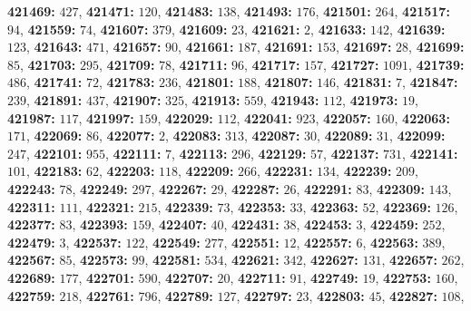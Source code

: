 \textsf{\bfseries 421469:} $427$, \textsf{\bfseries 421471:} $120$, \textsf{\bfseries 421483:} $138$, \textsf{\bfseries 421493:} $176$, \textsf{\bfseries 421501:} $264$, \textsf{\bfseries 421517:} $94$, \textsf{\bfseries 421559:} $74$, \textsf{\bfseries 421607:} $379$, \textsf{\bfseries 421609:} $23$, \textsf{\bfseries 421621:} $2$, \textsf{\bfseries 421633:} $142$, \textsf{\bfseries 421639:} $123$, \textsf{\bfseries 421643:} $471$, \textsf{\bfseries 421657:} $90$, \textsf{\bfseries 421661:} $187$, \textsf{\bfseries 421691:} $153$, \textsf{\bfseries 421697:} $28$, \textsf{\bfseries 421699:} $85$, \textsf{\bfseries 421703:} $295$, \textsf{\bfseries 421709:} $78$, \textsf{\bfseries 421711:} $96$, \textsf{\bfseries 421717:} $157$, \textsf{\bfseries 421727:} $1091$, \textsf{\bfseries 421739:} $486$, \textsf{\bfseries 421741:} $72$, \textsf{\bfseries 421783:} $236$, \textsf{\bfseries 421801:} $188$, \textsf{\bfseries 421807:} $146$, \textsf{\bfseries 421831:} $7$, \textsf{\bfseries 421847:} $239$, \textsf{\bfseries 421891:} $437$, \textsf{\bfseries 421907:} $325$, \textsf{\bfseries 421913:} $559$, \textsf{\bfseries 421943:} $112$, \textsf{\bfseries 421973:} $19$, \textsf{\bfseries 421987:} $117$, \textsf{\bfseries 421997:} $159$, \textsf{\bfseries 422029:} $112$, \textsf{\bfseries 422041:} $923$, \textsf{\bfseries 422057:} $160$, \textsf{\bfseries 422063:} $171$, \textsf{\bfseries 422069:} $86$, \textsf{\bfseries 422077:} $2$, \textsf{\bfseries 422083:} $313$, \textsf{\bfseries 422087:} $30$, \textsf{\bfseries 422089:} $31$, \textsf{\bfseries 422099:} $247$, \textsf{\bfseries 422101:} $955$, \textsf{\bfseries 422111:} $7$, \textsf{\bfseries 422113:} $296$, \textsf{\bfseries 422129:} $57$, \textsf{\bfseries 422137:} $731$, \textsf{\bfseries 422141:} $101$, \textsf{\bfseries 422183:} $62$, \textsf{\bfseries 422203:} $118$, \textsf{\bfseries 422209:} $266$, \textsf{\bfseries 422231:} $134$, \textsf{\bfseries 422239:} $209$, \textsf{\bfseries 422243:} $78$, \textsf{\bfseries 422249:} $297$, \textsf{\bfseries 422267:} $29$, \textsf{\bfseries 422287:} $26$, \textsf{\bfseries 422291:} $83$, \textsf{\bfseries 422309:} $143$, \textsf{\bfseries 422311:} $111$, \textsf{\bfseries 422321:} $215$, \textsf{\bfseries 422339:} $73$, \textsf{\bfseries 422353:} $33$, \textsf{\bfseries 422363:} $52$, \textsf{\bfseries 422369:} $126$, \textsf{\bfseries 422377:} $83$, \textsf{\bfseries 422393:} $159$, \textsf{\bfseries 422407:} $40$, \textsf{\bfseries 422431:} $38$, \textsf{\bfseries 422453:} $3$, \textsf{\bfseries 422459:} $252$, \textsf{\bfseries 422479:} $3$, \textsf{\bfseries 422537:} $122$, \textsf{\bfseries 422549:} $277$, \textsf{\bfseries 422551:} $12$, \textsf{\bfseries 422557:} $6$, \textsf{\bfseries 422563:} $389$, \textsf{\bfseries 422567:} $85$, \textsf{\bfseries 422573:} $99$, \textsf{\bfseries 422581:} $534$, \textsf{\bfseries 422621:} $342$, \textsf{\bfseries 422627:} $131$, \textsf{\bfseries 422657:} $262$, \textsf{\bfseries 422689:} $177$, \textsf{\bfseries 422701:} $590$, \textsf{\bfseries 422707:} $20$, \textsf{\bfseries 422711:} $91$, \textsf{\bfseries 422749:} $19$, \textsf{\bfseries 422753:} $160$, \textsf{\bfseries 422759:} $218$, \textsf{\bfseries 422761:} $796$, \textsf{\bfseries 422789:} $127$, \textsf{\bfseries 422797:} $23$, \textsf{\bfseries 422803:} $45$, \textsf{\bfseries 422827:} $108$, 
